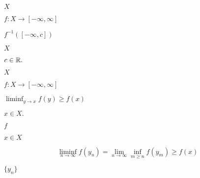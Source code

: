 \documentclass[10pt]{book}
\begin{document}
\begin{mdSnippets}
\begin{mdInlineSnippet}[02129bb861061d1a052c592e2dc6b383]
$X$\end{mdInlineSnippet}%
\begin{mdInlineSnippet}[9c3729f1b2ef77b97bbdb1135d803c69]%
$f: X \to [-\infty, \infty]$\end{mdInlineSnippet}%
\begin{mdInlineSnippet}[2e76e87b3447a2eda956d861af860dd2]%
$f^{-1}([-\infty, c])$\end{mdInlineSnippet}%
\begin{mdInlineSnippet}[02129bb861061d1a052c592e2dc6b383]%
$X$\end{mdInlineSnippet}%
\begin{mdInlineSnippet}%
$c \in \mathbb{R}.$\end{mdInlineSnippet}%
\begin{mdInlineSnippet}[02129bb861061d1a052c592e2dc6b383]%
$X$\end{mdInlineSnippet}%
\begin{mdInlineSnippet}[9c3729f1b2ef77b97bbdb1135d803c69]%
$f: X \to [-\infty, \infty]$\end{mdInlineSnippet}%
\begin{mdInlineSnippet}%
$\displaystyle \liminf_{y \to x} f(y) \ge f(x)$\end{mdInlineSnippet}%
\begin{mdInlineSnippet}[94a3ac7461d7486024cf3d570269399e]%
$x \in X.$\end{mdInlineSnippet}%
\begin{mdInlineSnippet}%
$f$\end{mdInlineSnippet}%
\begin{mdInlineSnippet}[4202025ca33a0244467654fcec511b07]%
$x \in X$\end{mdInlineSnippet}%
\begin{mdDisplaySnippet}[b410872062e9099f66c7aa1e26cc3706]%
\[%
\liminf_{n \to \infty} f(y_n) = \lim_{n \to \infty} \inf_{m \ge n} f(y_m) \ge f(x)
\]%
\end{mdDisplaySnippet}%
\begin{mdInlineSnippet}%
$\{y_n\}$\end{mdInlineSnippet}%

\end{mdSnippets}
\end{document}
